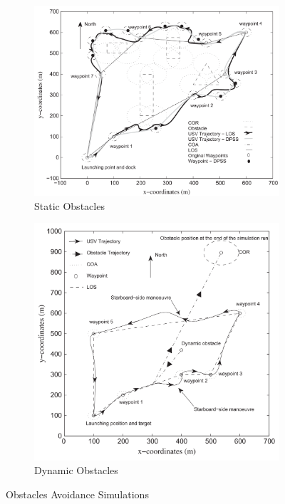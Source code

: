     \begin{figure}[H]
    \centering
    
        \begin{subfigure}[b]{0.5\textwidth}
            \centering
            \includegraphics[width=\textwidth]{figs/Chap3/Naeem2012COLREGS_Trajectories_StaticObstacles.png}
            \caption{Static Obstacles}
            \label{fig:Naeem2012COLREGS_Trajectories_StaticObstacles}
        \end{subfigure}
        \begin{subfigure}[b]{0.4\textwidth}
            \centering
            \includegraphics[width=\textwidth]{figs/Chap3/Naeem2012COLREGS_Trajectories_DynamicObstacles.png}
            \caption{Dynamic Obstacles}
            \label{fig:Naeem2012COLREGS_Trajectories_DynamicObstacles}
        \end{subfigure}
    
    \caption{Obstacles Avoidance Simulations \cite{Naeem2012COLREGS}}
    \label{fig:Naeem2012COLREGS_Trajectories}
    \end{figure}
